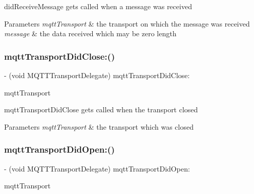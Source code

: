 did\+Receive\+Message gets called when a message was received 
\begin{DoxyParams}{Parameters}
{\em mqtt\+Transport} & the transport on which the message was received \\
\hline
{\em message} & the data received which may be zero length \\
\hline
\end{DoxyParams}
\mbox{\label{protocol_m_q_t_t_transport_delegate_01-p_afa32c4b8636994afa1ad02c6453971ff}} 
\subsubsection{\texorpdfstring{mqtt\+Transport\+Did\+Close\+:()}{mqttTransportDidClose:()}}
{\footnotesize\ttfamily -\/ (void M\+Q\+T\+T\+Transport\+Delegate) mqtt\+Transport\+Did\+Close\+: \begin{DoxyParamCaption}\item[{(\+\_\+\+Nonnull id$<$ \hyperlink{interface_m_q_t_t_transport}{M\+Q\+T\+T\+Transport} $>$)}]{mqtt\+Transport }\end{DoxyParamCaption}\hspace{0.3cm}{\ttfamily [optional]}}

mqtt\+Transport\+Did\+Close gets called when the transport closed 
\begin{DoxyParams}{Parameters}
{\em mqtt\+Transport} & the transport which was closed \\
\hline
\end{DoxyParams}
\mbox{\label{protocol_m_q_t_t_transport_delegate_01-p_a90420bb9f04760681e64a4a799fe432b}} 
\subsubsection{\texorpdfstring{mqtt\+Transport\+Did\+Open\+:()}{mqttTransportDidOpen:()}}
{\footnotesize\ttfamily -\/ (void M\+Q\+T\+T\+Transport\+Delegate) mqtt\+Transport\+Did\+Open\+: \begin{DoxyParamCaption}\item[{(\+\_\+\+Nonnull id$<$ \hyperlink{interface_m_q_t_t_transport}{M\+Q\+T\+T\+Transport} $>$)}]{mqtt\+Transport }\end{DoxyParamCaption}\hspace{0.3cm}{\ttfamily [optional]}}

